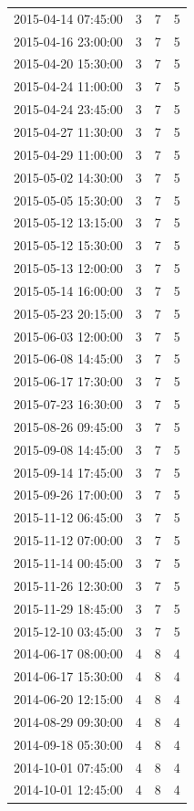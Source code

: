 \begin{tabular}{lrrr}
2015-04-14 07:45:00 & 3 & 7 & 5 \\
2015-04-16 23:00:00 & 3 & 7 & 5 \\
2015-04-20 15:30:00 & 3 & 7 & 5 \\
2015-04-24 11:00:00 & 3 & 7 & 5 \\
2015-04-24 23:45:00 & 3 & 7 & 5 \\
2015-04-27 11:30:00 & 3 & 7 & 5 \\
2015-04-29 11:00:00 & 3 & 7 & 5 \\
2015-05-02 14:30:00 & 3 & 7 & 5 \\
2015-05-05 15:30:00 & 3 & 7 & 5 \\
2015-05-12 13:15:00 & 3 & 7 & 5 \\
2015-05-12 15:30:00 & 3 & 7 & 5 \\
2015-05-13 12:00:00 & 3 & 7 & 5 \\
2015-05-14 16:00:00 & 3 & 7 & 5 \\
2015-05-23 20:15:00 & 3 & 7 & 5 \\
2015-06-03 12:00:00 & 3 & 7 & 5 \\
2015-06-08 14:45:00 & 3 & 7 & 5 \\
2015-06-17 17:30:00 & 3 & 7 & 5 \\
2015-07-23 16:30:00 & 3 & 7 & 5 \\
2015-08-26 09:45:00 & 3 & 7 & 5 \\
2015-09-08 14:45:00 & 3 & 7 & 5 \\
2015-09-14 17:45:00 & 3 & 7 & 5 \\
2015-09-26 17:00:00 & 3 & 7 & 5 \\
2015-11-12 06:45:00 & 3 & 7 & 5 \\
2015-11-12 07:00:00 & 3 & 7 & 5 \\
2015-11-14 00:45:00 & 3 & 7 & 5 \\
2015-11-26 12:30:00 & 3 & 7 & 5 \\
2015-11-29 18:45:00 & 3 & 7 & 5 \\
2015-12-10 03:45:00 & 3 & 7 & 5 \\
2014-06-17 08:00:00 & 4 & 8 & 4 \\
2014-06-17 15:30:00 & 4 & 8 & 4 \\
2014-06-20 12:15:00 & 4 & 8 & 4 \\
2014-08-29 09:30:00 & 4 & 8 & 4 \\
2014-09-18 05:30:00 & 4 & 8 & 4 \\
2014-10-01 07:45:00 & 4 & 8 & 4 \\
2014-10-01 12:45:00 & 4 & 8 & 4 \\

\end{tabular}
